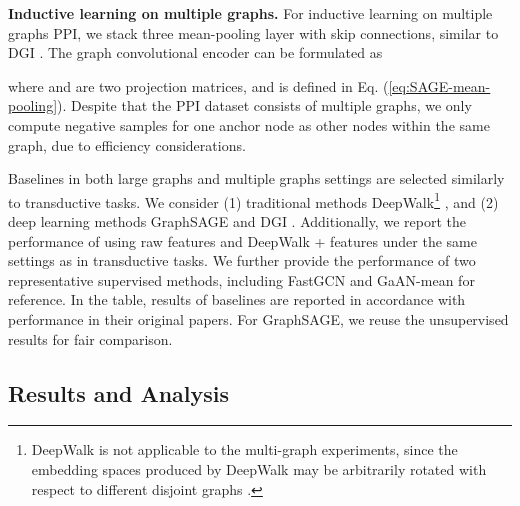 \documentclass{article}
\theoremstyle{remark}
\begin{document}
\textbf{Inductive learning on multiple graphs.\quad}
For inductive learning on multiple graphs PPI, we stack three mean-pooling layer with skip connections, similar to DGI \cite{Velickovic:2019tu}. The graph convolutional encoder can be formulated as

where  and  are two projection matrices, and  is defined in Eq. (\ref{eq:SAGE-mean-pooling}).
Despite that the PPI dataset consists of multiple graphs, we only compute negative samples for one anchor node as other nodes within the same graph, due to efficiency considerations.

Baselines in both large graphs and multiple graphs settings are selected similarly to transductive tasks. We consider (1) traditional methods DeepWalk\footnote{DeepWalk is not applicable to the multi-graph experiments, since the embedding spaces produced by DeepWalk may be arbitrarily rotated with respect to different disjoint graphs \cite{Hamilton:2017tp}.} \cite{Perozzi:2014ib}, and (2) deep learning methods GraphSAGE \cite{Hamilton:2017tp} and DGI \cite{Velickovic:2019tu}. Additionally, we report the performance of using raw features and DeepWalk + features under the same settings as in transductive tasks. We further provide the performance of two representative supervised methods, including FastGCN \cite{Chen:2018wp} and GaAN-mean \cite{Zhang:2018vn} for reference. In the table, results of baselines are reported in accordance with performance in their original papers. For GraphSAGE, we reuse the unsupervised results for fair comparison.



\subsection{Results and Analysis}
\end{document}
